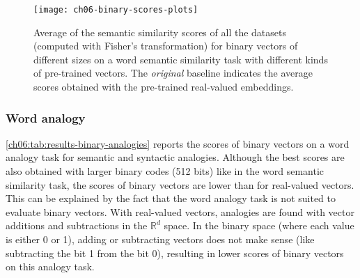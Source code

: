       \begin{figure}[b!]
        \centering
        \texttt{[image: ch06-binary-scores-plots]}
        \caption[Scores of binary vectors on a word semantic similarity task.]
        {Average of the semantic similarity scores of all the datasets (computed
        with Fisher's transformation) for binary vectors of different sizes on a
        word semantic similarity task with different kinds of pre-trained
        vectors. The \textit{original} baseline indicates the average scores
        obtained with the pre-trained real-valued embeddings.}
        \label{ch06:img:plot-binary-vectors}
      \end{figure}

    \subsubsection{Word analogy}
      \autoref{ch06:tab:results-binary-analogies} reports the scores of binary
      vectors on a word analogy task for semantic and syntactic analogies.
      Although the best scores are also obtained with larger binary codes (512
      bits) like in the word semantic similarity task, the scores of binary
      vectors are lower than for real-valued vectors. This can be explained by
      the fact that the word analogy task is not suited to evaluate binary
      vectors. With real-valued vectors, analogies are found with vector
      additions and subtractions in the $\mathbb{R}^d$ space. In the binary
      space (where each value is either 0 or 1), adding or subtracting vectors
      does not make sense (like subtracting the bit 1 from the bit 0), resulting
      in lower scores of binary vectors on this analogy task.

